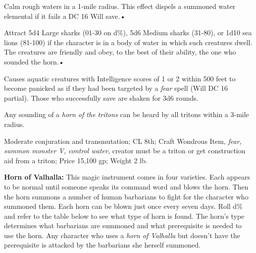Calm rough waters in a 1-mile radius. This effect dispels a summoned water elemental 
if it fails a DC 16 Will save.•

Attract 5d4 Large sharks (01-30 on d\%), 5d6 Medium sharks (31-80), or 1d10 sea 
lions (81-100) if the character is in a body of water in which such creatures dwell. 
The creatures are friendly and obey, to the best of their ability, the one who 
sounded the horn.•

Causes aquatic creatures with Intelligence scores of 1 or 2 within 500 feet to 
become panicked as if they had been targeted by a \textit{fear }spell (Will DC 
16 partial). Those who successfully save are shaken for 3d6 rounds.

Any sounding of a \textit{horn of the tritons }can be heard by all tritons within 
a 3-mile radius.

Moderate conjuration and transmutation; CL 8th; Craft Wondrous Item, \textit{fear, 
summon monster V, control water, }creator must be a triton or get construction 
aid from a triton; Price 15,100 gp; Weight 2 lb.

\textbf{Horn of Valhalla:} This magic instrument comes in four varieties. Each 
appears to be normal until someone speaks its command word and blows the horn. 
Then the horn summons a number of human barbarians to fight for the character who 
summoned them. Each horn can be blown just once every seven days. Roll d\% and 
refer to the table below to see what type of horn is found. The horn's type determines 
what barbarians are summoned and what prerequisite is needed to use the horn. Any 
character who uses a \textit{horn of Valhalla }but doesn't have the prerequisite 
is attacked by the barbarians she herself summoned.

